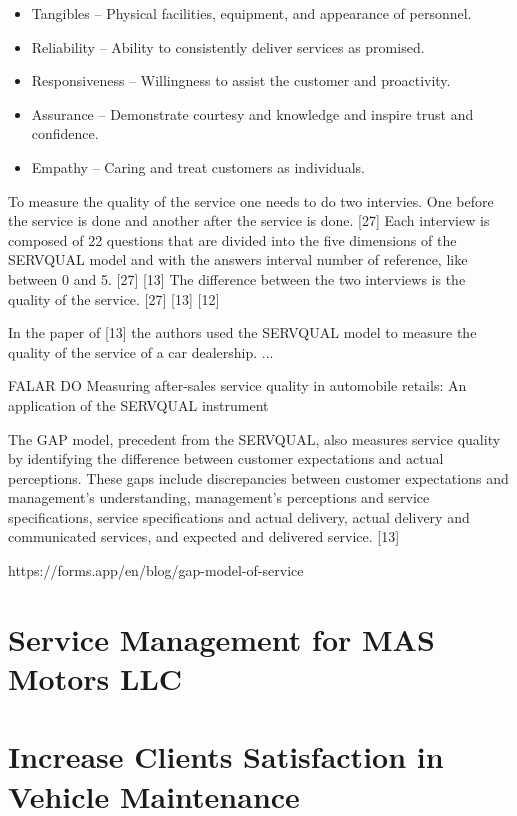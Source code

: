 \begin{itemize}
  \item Tangibles – Physical facilities, equipment, and appearance of personnel.
  \item Reliability – Ability to consistently deliver services as promised.
  \item Responsiveness – Willingness to assist the customer and proactivity.
  \item Assurance – Demonstrate courtesy and knowledge and inspire trust and confidence.
  \item Empathy – Caring and treat customers as individuals.
\end{itemize}

To measure the quality of the service one needs to do two intervies. One before the service is done and another after the service is done. [27]
Each interview is composed of 22 questions that are divided into the five dimensions of the SERVQUAL model and with the answers interval number of reference, like between 0 and 5. [27] [13]
The difference between the two interviews is the quality of the service. [27] [13] [12]

In the paper of [13] the authors used the SERVQUAL model to measure the quality of the service of a car dealership.
...

FALAR DO Measuring after-sales service quality in automobile retails: An application of the SERVQUAL instrument


The GAP model, precedent from the SERVQUAL, also measures service quality by identifying the difference between customer expectations and actual perceptions. 
These gaps include discrepancies between customer expectations and management's understanding, management’s perceptions and service specifications, service specifications and actual delivery, actual delivery and communicated services, and expected and delivered service. [13]

https://forms.app/en/blog/gap-model-of-service

\section{Service Management for MAS Motors LLC}

\section{Increase Clients Satisfaction in Vehicle Maintenance}